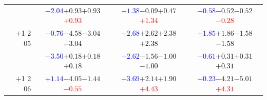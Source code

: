 \documentclass[compress]{beamer}
\begin{document}
\begin{frame}
\begin{tabular}{r | c | c | c}
          & \textcolor{blue}{$-2.04$}\hspace{0.1 cm}$+0.93$\hspace{0.1 cm}$+0.93$\hspace{0.1 cm}\textcolor{red}{$+0.93$} & \textcolor{blue}{$+1.38$}\hspace{0.1 cm}$-0.09$\hspace{0.1 cm}$+0.47$\hspace{0.1 cm}\textcolor{red}{$+1.34$} & \textcolor{blue}{$-0.58$}\hspace{0.1 cm}$-0.52$\hspace{0.1 cm}$-0.52$\hspace{0.1 cm}\textcolor{red}{$-0.28$} \\
$+$1 2 05 & \textcolor{blue}{$-0.76$}\hspace{0.1 cm}$-4.58$\hspace{0.1 cm}$-3.04$\hspace{0.1 cm}\textcolor{black}{$-3.04$} & \textcolor{blue}{$+2.68$}\hspace{0.1 cm}$+2.62$\hspace{0.1 cm}$+2.38$\hspace{0.1 cm}\textcolor{black}{$+2.38$} & \textcolor{blue}{$+1.85$}\hspace{0.1 cm}$+1.86$\hspace{0.1 cm}$-1.58$\hspace{0.1 cm}\textcolor{black}{$-1.58$} \\
          & \textcolor{blue}{$-3.50$}\hspace{0.1 cm}$+0.18$\hspace{0.1 cm}$+0.18$\hspace{0.1 cm}\textcolor{black}{$+0.18$} & \textcolor{blue}{$-2.62$}\hspace{0.1 cm}$-1.56$\hspace{0.1 cm}$-1.00$\hspace{0.1 cm}\textcolor{black}{$-1.00$} & \textcolor{blue}{$-0.61$}\hspace{0.1 cm}$+0.31$\hspace{0.1 cm}$+0.31$\hspace{0.1 cm}\textcolor{black}{$+0.31$} \\
$+$1 2 06 & \textcolor{blue}{$+1.14$}\hspace{0.1 cm}$-4.05$\hspace{0.1 cm}$-1.44$\hspace{0.1 cm}\textcolor{red}{$-0.55$} & \textcolor{blue}{$+3.69$}\hspace{0.1 cm}$+2.14$\hspace{0.1 cm}$+1.90$\hspace{0.1 cm}\textcolor{red}{$+4.43$} & \textcolor{blue}{$+0.23$}\hspace{0.1 cm}$-4.21$\hspace{0.1 cm}$-5.01$\hspace{0.1 cm}\textcolor{red}{$+4.31$} \\

\end{tabular}
\end{frame}
\end{document}
